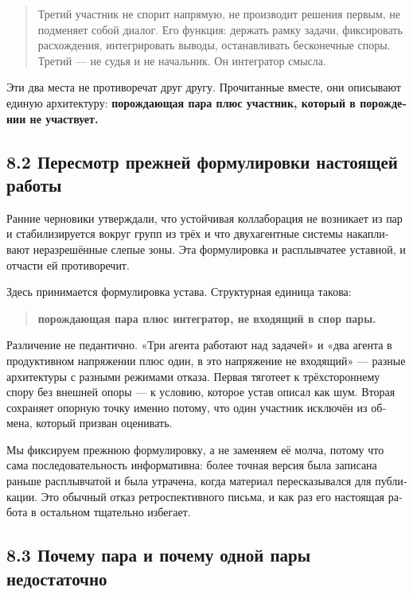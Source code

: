 \begin{russian}
\begin{quote}
Третий участник не спорит напрямую, не производит решения первым, не подменяет собой диалог. Его функция: держать рамку задачи, фиксировать расхождения, интегрировать выводы, останавливать бесконечные споры. Третий — не судья и не начальник. Он интегратор смысла.
\end{quote}
Эти два места не противоречат друг другу. Прочитанные вместе, они описывают единую архитектуру: \textbf{порождающая пара плюс участник, который в порождении не участвует.}


\subsection*{8.2 Пересмотр прежней формулировки настоящей работы}
\label{sec:ru:8.2}

Ранние черновики утверждали, что устойчивая коллаборация не возникает из пар и стабилизируется вокруг групп из трёх и что двухагентные системы накапливают неразрешённые слепые зоны. Эта формулировка и расплывчатее уставной, и отчасти ей противоречит.

Здесь принимается формулировка устава. Структурная единица такова:

\begin{quote}
\textbf{порождающая пара плюс интегратор, не входящий в спор пары.}
\end{quote}
Различение не педантично. «Три агента работают над задачей» и «два агента в продуктивном напряжении плюс один, в это напряжение не входящий» — разные архитектуры с разными режимами отказа. Первая тяготеет к трёхстороннему спору без внешней опоры — к условию, которое устав описал как шум. Вторая сохраняет опорную точку именно потому, что один участник исключён из обмена, который призван оценивать.

Мы фиксируем прежнюю формулировку, а не заменяем её молча, потому что сама последовательность информативна: более точная версия была записана раньше расплывчатой и была утрачена, когда материал пересказывался для публикации. Это обычный отказ ретроспективного письма, и как раз его настоящая работа в остальном тщательно избегает.


\subsection*{8.3 Почему пара и почему одной пары недостаточно}
\label{sec:ru:8.3}


\end{russian}
